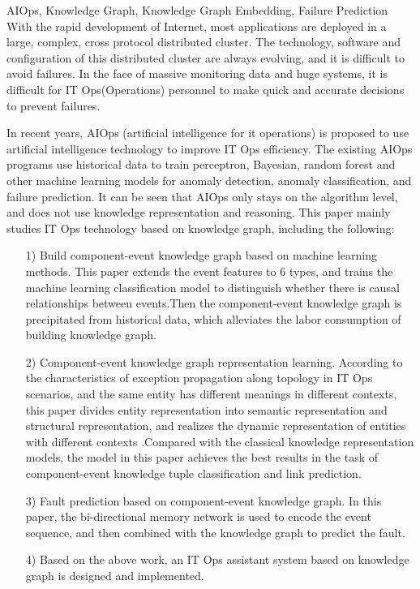 \begin{englishabstract}{AIOps, Knowledge Graph, Knowledge Graph Embedding, Failure Prediction}
    With the rapid development of Internet, most applications are deployed in a large, complex, cross protocol distributed cluster. The technology, software and configuration of this distributed cluster are always evolving, and it is difficult to avoid failures. In the face of massive monitoring data and huge systems, it is difficult for IT Ops(Operations) personnel to make quick and accurate decisions to prevent failures. 
    
    In recent years, AIOps (artificial intelligence for it operations) is proposed to use artificial intelligence technology to improve IT Ops efficiency. The existing AIOps programs use historical data to train perceptron, Bayesian, random forest and other machine learning models for anomaly detection, anomaly classification, and failure prediction. It can be seen that AIOps only stays on the algorithm level, and does not use knowledge representation and reasoning. This paper mainly studies IT Ops technology based on knowledge graph, including the following:
    \begin{itemize}
        \item [1)] 
        Build component-event knowledge graph based on machine learning methods. This paper extends the event features to 6 types, and trains the machine learning classification model to distinguish whether there is causal relationships between events.Then the component-event knowledge graph is precipitated from historical data, which alleviates the labor consumption of building knowledge graph.

        \item [2)]
        Component-event knowledge graph representation learning. 
        According to the characteristics of exception propagation along topology in IT Ops scenarios, and the same entity has different meanings in different contexts, this paper divides entity representation into semantic representation and structural representation, and realizes the dynamic representation of entities with different contexts .Compared with the classical knowledge representation models, the model in this paper achieves the best results in the task of component-event knowledge tuple classification and link prediction.
        
        \item [3)]
        Fault prediction based on component-event knowledge graph. In this paper, the bi-directional memory network is used to encode the event sequence, and then combined with the knowledge graph to predict the fault.

        \item [4)]
        Based on the above work, an IT Ops assistant system based on knowledge graph is designed and implemented. 
        
    \end{itemize}

\end{englishabstract}

